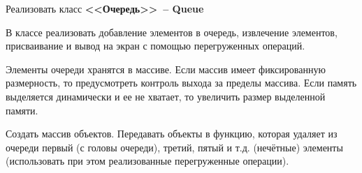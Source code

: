 Реализовать класс \textbf{<<Очередь>>~-- Queue}

В классе реализовать добавление элементов в очередь, извлечение
элементов, присваивание и вывод на экран с помощью перегруженных операций.

Элементы очереди хранятся в массиве. Если массив имеет фиксированную размерность,
то предусмотреть контроль выхода за пределы массива. Если память выделяется
динамически и ее не хватает, то увеличить размер выделенной памяти.

Создать массив
объектов. Передавать объекты в функцию, которая удаляет из очереди первый (с головы
очереди), третий, пятый и т.д. (нечётные) элементы (использовать при этом
реализованные перегруженные операции).

